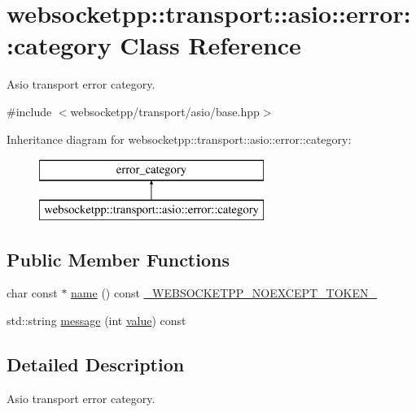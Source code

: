 \hypertarget{classwebsocketpp_1_1transport_1_1asio_1_1error_1_1category}{}\section{websocketpp\+:\+:transport\+:\+:asio\+:\+:error\+:\+:category Class Reference}
\label{classwebsocketpp_1_1transport_1_1asio_1_1error_1_1category}


Asio transport error category.  




{\ttfamily \#include $<$websocketpp/transport/asio/base.\+hpp$>$}

Inheritance diagram for websocketpp\+:\+:transport\+:\+:asio\+:\+:error\+:\+:category\+:\begin{figure}[H]
\begin{center}
\leavevmode
\includegraphics[height=2.000000cm]{classwebsocketpp_1_1transport_1_1asio_1_1error_1_1category}
\end{center}
\end{figure}
\subsection*{Public Member Functions}
\begin{DoxyCompactItemize}
\item 
char const $\ast$ \hyperlink{classwebsocketpp_1_1transport_1_1asio_1_1error_1_1category_af661dabfb4baefe6954d785b3b4fea57}{name} () const \hyperlink{boost__config_8hpp_aa19747404a5f2fe9c9eb9e9d2e48f26c}{\+\_\+\+W\+E\+B\+S\+O\+C\+K\+E\+T\+P\+P\+\_\+\+N\+O\+E\+X\+C\+E\+P\+T\+\_\+\+T\+O\+K\+E\+N\+\_\+}
\item 
std\+::string \hyperlink{classwebsocketpp_1_1transport_1_1asio_1_1error_1_1category_adcf201fda0a1ebf88040eba836f1ba59}{message} (int \hyperlink{namespacewebsocketpp_1_1transport_1_1asio_1_1error_aeb44b27fc0ffac2a8991bf629cbfd045}{value}) const 
\end{DoxyCompactItemize}


\subsection{Detailed Description}
Asio transport error category. 

